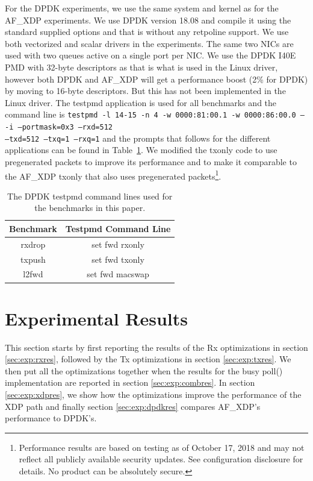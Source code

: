 \documentclass[9pt,numbers,reprint]{sigplanconf}
\begin{document}
For the DPDK experiments, we use the same system and kernel as for the
AF\_XDP experiments. We use DPDK version 18.08 and compile it using
the standard supplied options and that is without any retpoline
support. We use both vectorized and scalar drivers in the
experiments. The same two NICs are used with two queues active on a
single port per NIC. We use the DPDK I40E PMD with 32-byte descriptors
as that is what is used in the Linux driver, however both DPDK and
AF\_XDP will get a performance boost (2\% for DPDK) by moving to
16-byte descriptors. But this has not been implemented in the Linux
driver. The testpmd application is used for all benchmarks and the
command line is \texttt{testpmd -l 14-15 -n 4 -w 0000:81:00.1 -w
  0000:86:00.0 -- -i --portmask=0x3 --rxd=512\\  --txd=512 --txq=1
  --rxq=1} and the prompts that follows for the different applications
can be found in Table~\ref{table:dpdk_commands}. We modified the
txonly code to use pregenerated packets to improve its performance and
to make it comparable to the AF\_XDP txonly that also uses
pregenerated packets\footnote{Performance results are based on testing
  as of October 17, 2018 and may not reflect all publicly available
  security updates. See configuration disclosure for details. No
  product can be absolutely secure.}.

\begin{table}[ht]
\centering
\begin{tabular}{|c|c|} \hline
\textbf{Benchmark} & \textbf{Testpmd Command Line} \\ \hline
rxdrop & set fwd rxonly\\ \hline
txpush & set fwd txonly\\ \hline
l2fwd & set fwd macswap\\ \hline
\end{tabular}
\caption{The DPDK testpmd command lines used for the benchmarks in
  this paper.}
\label{table:dpdk_commands}
\end{table}


\section{Experimental Results}
\label{sec:exp:res}

This section starts by first reporting the results of the Rx
optimizations in section \ref{sec:exp:rxres}, followed by the Tx
optimizations in section \ref{sec:exp:txres}. We then put all the
optimizations together when the results for the busy poll()
implementation are reported in section \ref{sec:exp:combres}. In
section \ref{sec:exp:xdpres}, we show how the optimizations improve
the performance of the XDP path and finally section
\ref{sec:exp:dpdkres} compares AF\_XDP's performance to DPDK's.
\end{document}
